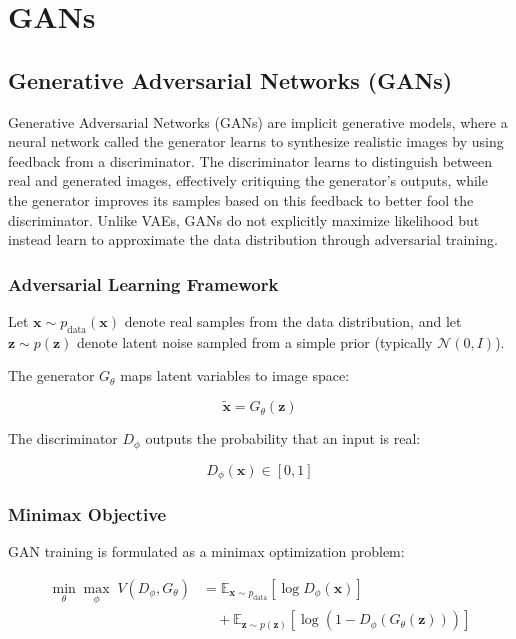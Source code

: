 \chapter{GANs}
\label{chap:GANs}
\section{Generative Adversarial Networks (GANs)}
\label{sec:gan_theory}

Generative Adversarial Networks (GANs) \cite{goodfellow2014generativeadversarialnetworks} are 
implicit generative models, where a neural network called the generator learns to synthesize 
realistic images by using feedback from a discriminator. The discriminator learns to distinguish 
between real and generated images, effectively critiquing the generator’s outputs, while the 
generator improves its samples based on this feedback to better fool the discriminator. Unlike 
VAEs, GANs do not explicitly maximize likelihood but instead learn to approximate the data 
distribution through adversarial training.

\subsection{Adversarial Learning Framework}

Let $\mathbf{x} \sim p_{\text{data}}(\mathbf{x})$ denote real samples from the data distribution, and let $\mathbf{z} \sim p(\mathbf{z})$ denote latent noise sampled from a simple prior (typically $\mathcal{N}(0, I)$).

The generator $G_\theta$ maps latent variables to image space:

\begin{equation}
\tilde{\mathbf{x}} = G_\theta(\mathbf{z})
\end{equation}

The discriminator $D_\phi$ outputs the probability that an input is real:

\begin{equation}
D_\phi(\mathbf{x}) \in [0,1]
\end{equation}

\subsection{Minimax Objective}

GAN training is formulated as a minimax optimization problem:

\begin{align}
\min_\theta \max_\phi \; V(D_\phi, G_\theta)
&=
\mathbb{E}_{\mathbf{x} \sim p_{\text{data}}}
\left[
\log D_\phi(\mathbf{x})
\right]
\\
&\quad +
\mathbb{E}_{\mathbf{z} \sim p(\mathbf{z})}
\left[
\log \left(1 - D_\phi(G_\theta(\mathbf{z}))\right)
\right]
\end{align}

